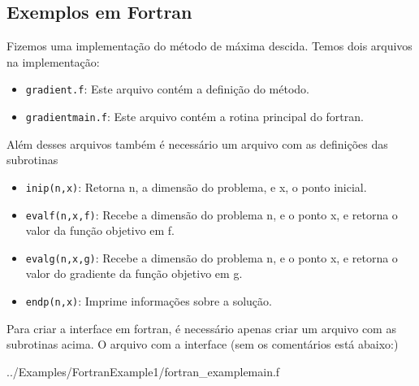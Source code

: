 \subsection{Exemplos em Fortran}
Fizemos uma implementação do método de máxima descida. Temos dois arquivos na
implementação:
\begin{itemize}
 \item \verb+gradient.f+: Este arquivo contém a definição do método.
 \item \verb+gradientmain.f+: Este arquivo contém a rotina principal do fortran.
\end{itemize} Além desses arquivos também é necessário um arquivo com as
definições das subrotinas
\begin{itemize}
 \item \verb+inip(n,x)+: Retorna n, a dimensão do problema, e x, o ponto
 inicial.
 \item \verb+evalf(n,x,f)+: Recebe a dimensão do problema n, e o ponto x, e
retorna o valor da função objetivo em f.
 \item \verb+evalg(n,x,g)+: Recebe a dimensão do problema n, e o ponto x, e
retorna o valor do gradiente da função objetivo em g.
 \item \verb+endp(n,x)+: Imprime informações sobre a solução.
\end{itemize}
Para criar a interface em fortran, é necessário apenas criar um arquivo com as
subrotinas acima. O arquivo com a interface (sem os comentários está abaixo:)

{../Examples/FortranExample1/fortran_examplemain.f}
